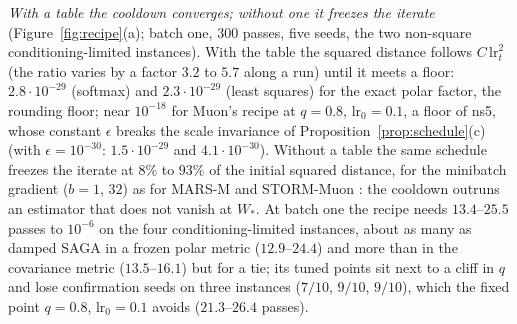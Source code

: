 \documentclass[10pt]{article}
\theoremstyle{remark}
\begin{document}
\begin{description}[leftmargin=2.3em,labelwidth=2.0em,labelsep=0.3em,itemsep=1pt,topsep=3pt,parsep=0pt,font=\normalfont\bfseries]
\item[(M5)] \emph{With a table the cooldown converges; without one it freezes the iterate} (Figure~\ref{fig:recipe}(a);
batch one, $300$ passes, five seeds, the two non-square conditioning-limited instances). With the table the squared
distance follows $C\,\mathrm{lr}_t^2$ (the ratio varies by a factor $3.2$ to $5.7$ along a run) until it meets a floor:
$2.8\cdot10^{-29}$ (softmax) and $2.3\cdot10^{-29}$ (least squares) for the exact polar factor, the rounding floor; near
$10^{-18}$ for Muon's recipe at $q=0.8$, $\mathrm{lr}_0=0.1$, a floor of ns5, whose constant $\epsilon$ breaks the scale
invariance of Proposition~\ref{prop:schedule}(c) (with $\epsilon=10^{-30}$: $1.5\cdot10^{-29}$ and $4.1\cdot10^{-30}$).
Without a table the same schedule freezes the iterate at $8\%$ to $93\%$ of the initial squared distance, for the
minibatch gradient ($b=1$, $32$) as for MARS-M \cite{liu2025marsm} and STORM-Muon \cite{cutkosky2019momentum}: the cooldown outruns an
estimator that does not vanish at $W_\ast$. At batch one the recipe needs $13.4$--$25.5$ passes to $10^{-6}$ on the four
conditioning-limited instances, about as many as damped SAGA in a frozen polar metric ($12.9$--$24.4$) and more than in the
covariance metric ($13.5$--$16.1$) but for a tie; its tuned points sit next to a cliff in $q$ and lose confirmation seeds
on three instances ($7/10$, $9/10$, $9/10$), which the fixed point $q=0.8$, $\mathrm{lr}_0=0.1$ avoids ($21.3$--$26.4$
passes).
\end{description}
\end{document}
